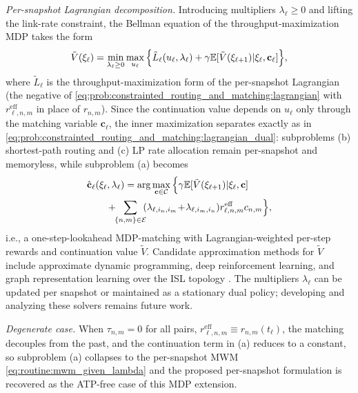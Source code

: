 \documentclass[journal]{IEEEtran}
\begin{document}
\noindent\textit{Per-snapshot Lagrangian decomposition.} Introducing multipliers $\lambda_\ell\geq 0$ and lifting the link-rate constraint, the Bellman equation of the throughput-maximization MDP takes the form
\begin{equation}
\tilde{V}(\xi_\ell)=\min_{\lambda_\ell\geq 0}\max_{u_\ell}\Big\{\tilde{L}_\ell(u_\ell,\lambda_\ell)+\gamma\mathbb{E}[\tilde{V}(\xi_{\ell+1})|\xi_\ell,\mathbf{c}_\ell]\Big\},\notag
\end{equation}
where $\tilde{L}_\ell$ is the throughput-maximization form of the per-snapshot Lagrangian (the negative of \eqref{eq:prob:constrainted_routing_and_matching:lagrangian} with $r^{\text{eff}}_{\ell,n,m}$ in place of $r_{n,m}$). Since the continuation value depends on $u_\ell$ only through the matching variable $\mathbf{c}_\ell$, the inner maximization separates exactly as in \eqref{eq:prob:constrainted_routing_and_matching:lagrangian_dual}: subproblems (b) shortest-path routing and (c) LP rate allocation remain per-snapshot and memoryless, while subproblem (a) becomes
\begin{equation}
\begin{aligned}
&\hat{\mathbf{c}}_\ell(\xi_\ell,\lambda_\ell)=\arg\max_{\mathbf{c}\in\mathcal{C}}\Big\{\gamma\mathbb{E}[\tilde{V}(\xi_{\ell+1})|\xi_\ell,\mathbf{c}]\\
&\qquad+\!\!\sum_{\{n,m\}\in\mathcal{E}}\!\!(\lambda_{\ell,i_n,i_m}\!+\!\lambda_{\ell,i_m,i_n})r^{\text{eff}}_{\ell,n,m}c_{n,m}\Big\},
\end{aligned}\notag
\end{equation}
i.e., a one-step-lookahead MDP-matching with Lagrangian-weighted per-step rewards and continuation value $\tilde{V}$. Candidate approximation methods for $\tilde{V}$ include approximate dynamic programming, deep reinforcement learning, and graph representation learning over the ISL topology \cite{gu2021knowledge,gu2024graph}. The multipliers $\lambda_\ell$ can be updated per snapshot or maintained as a stationary dual policy; developing and analyzing these solvers remains future work.

\noindent\textit{Degenerate case.} When $\tau_{n,m}=0$ for all pairs, $r^{\text{eff}}_{\ell,n,m}\equiv r_{n,m}(t_\ell)$, the matching decouples from the past, and the continuation term in (a) reduces to a constant, so subproblem (a) collapses to the per-snapshot MWM \eqref{eq:routine:mwm_given_lambda} and the proposed per-snapshot formulation is recovered as the ATP-free case of this MDP extension.
\end{document}
